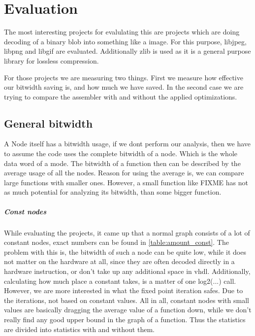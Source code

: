 \chapter{Evaluation}\label{sec:eval}

The most interesting projects for evalulating this are projects which are doing decoding of a binary blob into something like a image. For this purpose, libjpeg, libpng and libgif are evaluated. Additionally zlib is used as it is a general purpose library for lossless compression.

For those projects we are measuring two things. First we measure how effective our bitwidth saving is, and how much we have saved. In the second case we are trying to compare the assembler with and without the applied optimizations.

\section{General bitwidth}
A Node itself has a bitwidth usage, if we dont perform our analysis, then we have to assume the code uses the complete bitwidth of a node. Which is the whole data word of a mode.
The bitwidth of a function then can be described by the average usage of all the nodes. Reason for using the average is, we can compare large functions with smaller ones. However, a small function like FIXME has not as much potential for analyzing its bitwidth, than some bigger function.
\paragraph{Const nodes}

While evaluating the projects, it came up that a normal graph consists of a lot of constant nodes, exact numbers can be found in \autoref{table:amount_const}. The problem with this is, the bitwidth of such a node can be quite low, while it does not matter on the hardware at all, since they are often decoded directly in a hardware instruction, or don't take up any additional space in vhdl. Additionally, calculating how much place a constant takes, is a matter of one log2(...) call. However, we are more interested in what the fixed point iteration safes. Due to the iterations, not based on constant values.
All in all, constant nodes with small values are basically dragging the average value of a function down, while we don't really find any good upper bound in the graph of a function.
Thus the statistics are divided into statistics with and without them.


